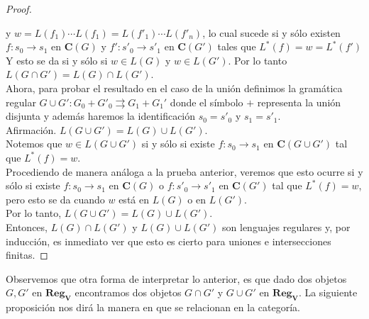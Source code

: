 \documentclass[../main.tex]{subfiles}
\begin{document}
\begin{proof}
\begin{multicols}{2}
 		\begin{center}
 		\end{center}
 	\end{multicols}
 	y $w=L(f_1)\cdots L(f_1)=L(f'_1)\cdots L(f'_n)$, lo cual sucede si y sólo existen $f:s_0 \to s_1$ en $\mathbf{C}(G)$ y $f': s'_0 \to s'_1$ en $\mathbf{C}(G')$ tales que $L^*(f)=w=L^*(f')$ \\
 	Y esto se da si y sólo si $w \in L(G)$ y $w \in L(G')$. Por lo tanto $L(G\cap G')=L(G) \cap L(G')$. \\
 	Ahora, para probar el resultado en el caso de la unión definimos la gramática regular $G \cup G':G_0+G'_0 \rightrightarrows G_1+G_1'$ donde el símbolo $+$ representa la unión disjunta y además haremos la identificación $s_0=s'_0$ y $s_1=s'_1$. \\
 	Afirmación. $L(G \cup G') = L(G) \cup L(G')$. \\
 	Notemos que $w \in L(G \cup G')$ si y sólo si existe $f:s_0 \to s_1$ en $\mathbf{C}(G \cup G')$ tal que $L^*(f)=w$. \\
 	Procediendo de manera análoga a la prueba anterior, veremos que esto ocurre si y sólo si existe $f:s_0 \to s_1$ en $\mathbf{C}(G)$ o $f:s'_0 \to s'_1$ en $\mathbf{C}(G')$ tal que $L^*(f)=w$, pero esto se da cuando $w$ está en $L(G)$ o en $L(G')$. \\
 	Por lo tanto, $L(G\cup G') = L(G)\cup L(G')$. \\
 	Entonces, $L(G)\cap L(G')$ y $L(G)\cup L(G')$ son lenguajes regulares y, por inducción, es inmediato ver que esto es cierto para uniones e intersecciones finitas. 
 \end{proof}
 
 Observemos que otra forma de interpretar lo anterior, es que dado dos objetos $G,G'$ en $\mathbf{Reg_V}$ encontramos dos objetos $G\cap G'$ y $G\cup G'$ en $\mathbf{Reg_V}$. La siguiente proposición nos dirá la manera en que se relacionan en la categoría. 
 
\end{document}
